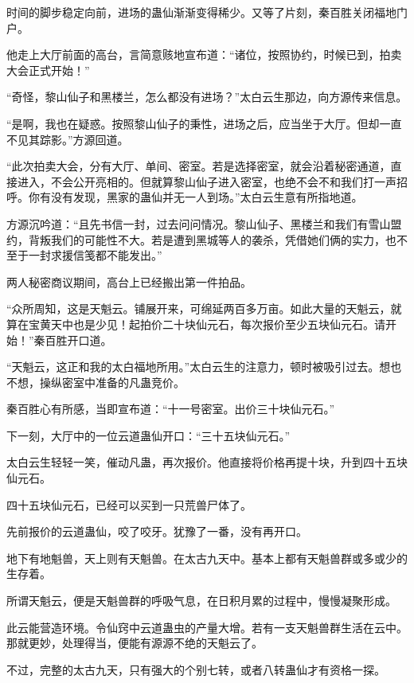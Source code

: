 
\begin{this_body}

时间的脚步稳定向前，进场的蛊仙渐渐变得稀少。又等了片刻，秦百胜关闭福地门户。

他走上大厅前面的高台，言简意赅地宣布道：“诸位，按照协约，时候已到，拍卖大会正式开始！”

“奇怪，黎山仙子和黑楼兰，怎么都没有进场？”太白云生那边，向方源传来信息。

“是啊，我也在疑惑。按照黎山仙子的秉性，进场之后，应当坐于大厅。但却一直不见其踪影。”方源回道。

“此次拍卖大会，分有大厅、单间、密室。若是选择密室，就会沿着秘密通道，直接进入，不会公开亮相的。但就算黎山仙子进入密室，也绝不会不和我们打一声招呼。你有没有发现，黑家的蛊仙并无一人到场。”太白云生意有所指地道。

方源沉吟道：“且先书信一封，过去问问情况。黎山仙子、黑楼兰和我们有雪山盟约，背叛我们的可能性不大。若是遭到黑城等人的袭杀，凭借她们俩的实力，也不至于一封求援信笺都不能发出。”

两人秘密商议期间，高台上已经搬出第一件拍品。

“众所周知，这是天魁云。铺展开来，可绵延两百多万亩。如此大量的天魁云，就算在宝黄天中也是少见！起拍价二十块仙元石，每次报价至少五块仙元石。请开始！”秦百胜开口道。

“天魁云，这正和我的太白福地所用。”太白云生的注意力，顿时被吸引过去。想也不想，操纵密室中准备的凡蛊竞价。

秦百胜心有所感，当即宣布道：“十一号密室。出价三十块仙元石。”

下一刻，大厅中的一位云道蛊仙开口：“三十五块仙元石。”

太白云生轻轻一笑，催动凡蛊，再次报价。他直接将价格再提十块，升到四十五块仙元石。

四十五块仙元石，已经可以买到一只荒兽尸体了。

先前报价的云道蛊仙，咬了咬牙。犹豫了一番，没有再开口。

地下有地魁兽，天上则有天魁兽。在太古九天中。基本上都有天魁兽群或多或少的生存着。

所谓天魁云，便是天魁兽群的呼吸气息，在日积月累的过程中，慢慢凝聚形成。

此云能营造环境。令仙窍中云道蛊虫的产量大增。若有一支天魁兽群生活在云中。那就更妙，处理得当，便能有源源不绝的天魁云了。

不过，完整的太古九天，只有强大的个别七转，或者八转蛊仙才有资格一探。


\end{this_body}
